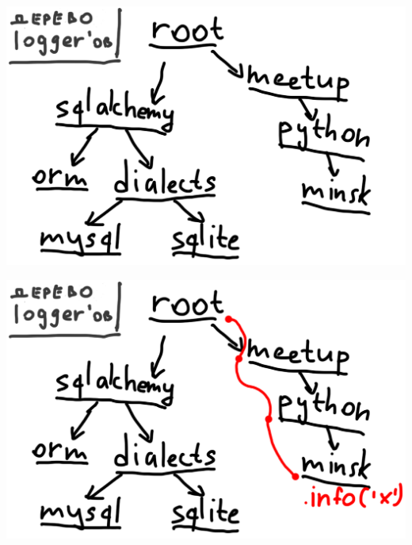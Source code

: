 \documentclass[aspectratio=169]{beamer}
\begin{document}
\begin{frame}
  \begin{center}
    \includegraphics[scale=0.63]{img/loggers1.png}
  \end{center}
\end{frame}


\begin{frame}
  \begin{center}
    \includegraphics[scale=0.63]{img/loggers2.png}
  \end{center}
\end{frame}
\end{document}
